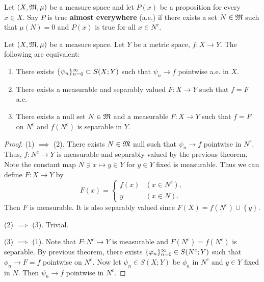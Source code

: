 \documentclass[a4paper]{article}
\begin{document}
\begin{defi}

Let $(X, \mathfrak{M}, \mu)$ be a measure space and let
$P(x)$ be a proposition for every $x \in X$. Say
$P$ is true \textbf{almost everywhere} (a.e.) if there exists
a set $N \in \mathfrak{M}$ such that $\mu(N) = 0$ and
$P(x)$ is true for all $x \in N^c$.

\end{defi}

\begin{thm}
  Let $(X, \mathfrak{M}, \mu)$ be a measure space. Let $Y$ be a
  metric space, $f: X \to Y$. The following are equivalent:
  \begin{enumerate}
    \item There exists $\{ \psi_n \}_{n=0}^\infty \subset S(X; Y)$
    such that $\psi_n \to f$ pointwise a.e. in $X$.
    \item There exists a measurable and separably valued
    $F : X \to Y$ such that $f = F$ a.e.
    \item There exists a null set $N \in \mathfrak{M}$ and a
    measurable $F: X \to Y$ such that $f = F$
    on $N^c$ and $f(N^c)$ is separable in
    $Y$.
  \end{enumerate}
\end{thm}

\begin{proof}

(1) $\implies$ (2). There exists $N \in \mathfrak{M}$ null such that
$\psi_n \to f$ pointwise in $N^c$. Thus,
$f: N^c \to Y$ is measurable and separably valued
by the previous theorem. Note the constant map
$N \ni x \mapsto y \in Y$ for $y \in Y$ fixed is measurable.
Thus we can define $F : X \to Y$ by
\[
F(x) = \begin{cases}
  f(x) & (x \in N^c), \\
  y & (x \in N).
\end{cases}
\]
Then $F$ is measurable. It is also separably valued
since $F(X) = f(N^c) \cup \left\{ y \right\}$.

(2) $\implies$ (3). Trivial.

(3) $\implies$ (1). Note that $F: N^c \to Y$ is measurable
and $F(N^c) = f(N^c)$ is separable.
By previous theorem, there exists $\{ \varphi_n \}_{n=0}^\infty \in S(N^c;
Y)$ such that $\phi_n \to F = f$
pointwise on $N^c$.
Now let $\psi_n \in S(X; Y)$ be $\phi_n$ in $N^c$
and $y \in Y$ fixed in $N$. Then $\psi_n \to f$ pointwise
in $N^c$.

\end{proof}
\end{document}
